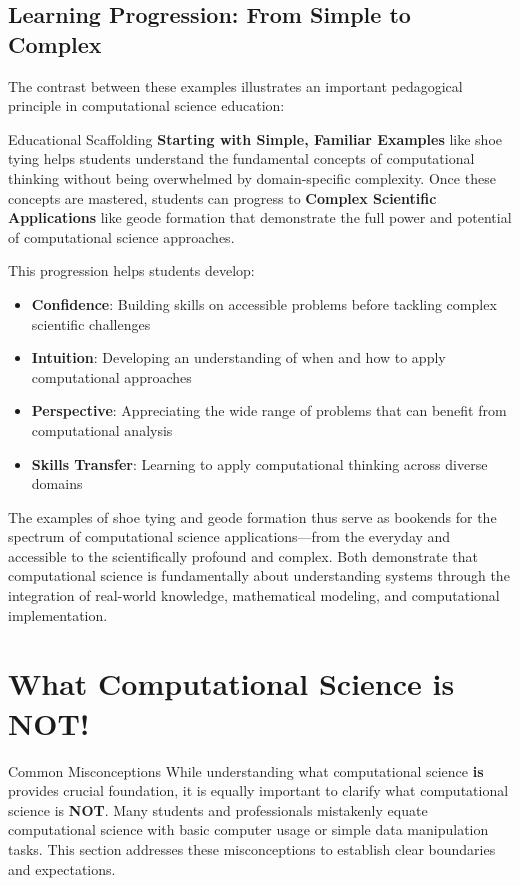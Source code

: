\subsection{Learning Progression: From Simple to Complex}

The contrast between these examples illustrates an important pedagogical principle in computational science education:

\begin{highlightbox}{Educational Scaffolding}
\textbf{Starting with Simple, Familiar Examples} like shoe tying helps students understand the fundamental concepts of computational thinking without being overwhelmed by domain-specific complexity. Once these concepts are mastered, students can progress to \textbf{Complex Scientific Applications} like geode formation that demonstrate the full power and potential of computational science approaches.
\end{highlightbox}

This progression helps students develop:
\begin{itemize}
    \item \textbf{Confidence}: Building skills on accessible problems before tackling complex scientific challenges
    \item \textbf{Intuition}: Developing an understanding of when and how to apply computational approaches
    \item \textbf{Perspective}: Appreciating the wide range of problems that can benefit from computational analysis
    \item \textbf{Skills Transfer}: Learning to apply computational thinking across diverse domains
\end{itemize}

The examples of shoe tying and geode formation thus serve as bookends for the spectrum of computational science applications—from the everyday and accessible to the scientifically profound and complex. Both demonstrate that computational science is fundamentally about understanding systems through the integration of real-world knowledge, mathematical modeling, and computational implementation.

\section{What Computational Science is NOT!}

\begin{warningbox}{Common Misconceptions}
While understanding what computational science \textbf{is} provides crucial foundation, it is equally important to clarify what computational science is \textbf{NOT}. Many students and professionals mistakenly equate computational science with basic computer usage or simple data manipulation tasks. This section addresses these misconceptions to establish clear boundaries and expectations.
\end{warningbox}

